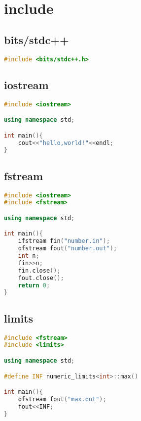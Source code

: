 \documentclass[12pt,twiside,a4paper]{ctexbook}
\numberwithin{chapter}{part}
\begin{document}

\chapter{include}
\section{bits/stdc++}
\begin{lstlisting}[language=C++]
#include <bits/stdc++.h>
\end{lstlisting}
\section{iostream}
\begin{lstlisting}[language=C++]
#include <iostream>

using namespace std;

int main(){
	cout<<"hello,world!"<<endl;
}
\end{lstlisting}

\section{fstream}
\begin{lstlisting}[language=C++]
#include <iostream>
#include <fstream>

using namespace std;

int main(){
	ifstream fin("number.in");
	ofstream fout("number.out");
	int n;
	fin>>n;
	fin.close();
	fout.close();
	return 0;
}
\end{lstlisting}
\section{limits}
\begin{lstlisting}[language=C++]
#include <fstream>
#include <limits>

using namespace std;

#define INF numeric_limits<int>::max()

int main(){
	ofstream fout("max.out");
	fout<<INF;
}
\end{lstlisting}
\end{document}
